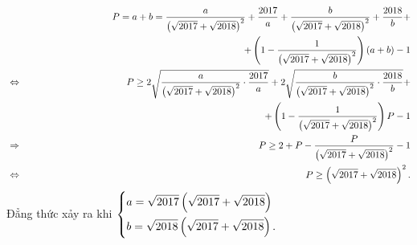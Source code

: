 {\begin{vd}
{\begin{eqnarray*}
			&&P=a+b=\dfrac{a}{\left(\sqrt{2017}+\sqrt{2018}\right)^2}+\dfrac{2017}{a}+\dfrac{b}{\left(\sqrt{2017}+\sqrt{2018}\right)^2}+\dfrac{2018}{b}+\\ &&\hfill \hspace*{8cm} +\left(1-\dfrac{1}{\left(\sqrt{2017}+\sqrt{2018}\right)^2}\right)(a+b)-1\\
			&\Leftrightarrow & P \geq 2\sqrt{\dfrac{a}{\left(\sqrt{2017}+\sqrt{2018}\right)^2}\cdot \dfrac{2017}{a}}+2\sqrt{\dfrac{b}{\left(\sqrt{2017}+\sqrt{2018}\right)^2}\cdot \dfrac{2018}{b}}+\\
			&&\hfill \hspace*{8cm} +\left(1-\dfrac{1}{\left(\sqrt{2017}+\sqrt{2018}\right)^2}\right)P-1\\
			&\Rightarrow & P \geq 2+P- \dfrac{P}{\left(\sqrt{2017}+\sqrt{2018}\right)^2}-1\\
			&\Leftrightarrow & P \geq \left(\sqrt{2017}+\sqrt{2018}\right)^2.	
		\end{eqnarray*}
		Đẳng thức xảy ra khi $\left\{\begin{aligned}& a=\sqrt{2017} \left( \sqrt{2017}+\sqrt{2018}\right)\\&  b=\sqrt{2018}\left(\sqrt{2017}+\sqrt{2018}\right).\end{aligned}\right.$}
\end{vd}

}
